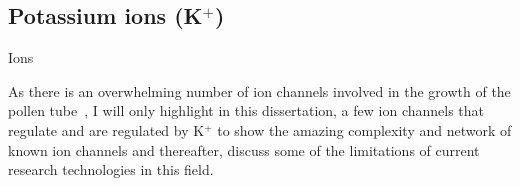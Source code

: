 \documentclass[11pt]{article}
\begin{document}
\begin{multicols}{2}
\subsection{Potassium ions (K$^{+}$)}
Ions 

As there is an overwhelming number of ion channels involved in the growth of the pollen tube~\citep{Michard2009}, I will only highlight in this dissertation, a few ion channels that regulate and are regulated by K$^{+}$ to show the amazing complexity and network of known ion channels and thereafter, discuss some of the limitations of current research technologies in this field. 

\newpage 



\end{multicols}
\end{document}
